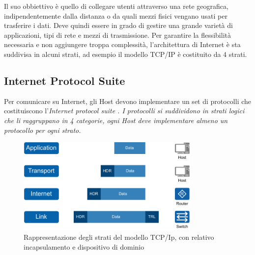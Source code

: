 Il suo obbiettivo è quello di collegare utenti attraverso una rete geografica, indipendentemente dalla distanza o da quali mezzi fisici vengano usati per trasferire i dati. Deve quindi essere in grado di gestire una grande varietà di applicazioni, tipi di rete e mezzi di trasmissione. Per garantire la flessibilità necessaria e non aggiungere troppa complessità, l'architettura di Internet è sta suddivisa in alcuni strati, ad esempio il modello TCP/IP è costituito da 4 strati. 


\subsection{Internet Protocol Suite}

Per comunicare su Internet, gli Host devono implementare un set di protocolli che costituiscono l'\it{Internet protocol suite} \cite{RFC_1122}. I protocolli si suddividono in strati logici che li raggruppano in 4 categorie, ogni Host deve implementare almeno un protocollo per ogni strato.

\begin{figure}[H]
    \centering
    \includegraphics[width=0.8\textwidth]{immagini/diag2-modello_a_strati}
    \caption{Rappresentazione degli strati del modello TCP/Ip, con relativo incapsulamento e dispositivo di dominio}
    \label{fig:modello-a-strati}
\end{figure}

